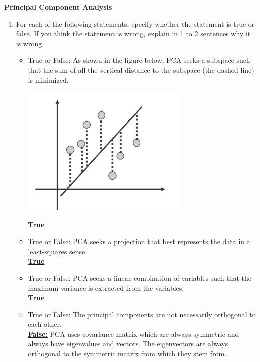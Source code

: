 \begin{Q}
\textbf{\Large Principal Component Analysis}\\

\begin{enumerate}

\item For each of the following statements, specify whether the statement is true or false. If you think the statement is wrong, explain in 1 to 2 sentences why it is wrong.


\begin{itemize}
\item True or False: As shown in the figure below, PCA seeks a subspace such that the sum of all the vertical distance to the subspace (the dashed line) is minimized.
\begin{center}
 \includegraphics[width=8cm]{figs/pca.pdf}
 \end{center}
\underline{\textbf{True}}


\item True or False: PCA seeks a projection that best represents the data in a least-squares sense.\\
\textbf{\underline{True}}

\item  True or False: PCA seeks a linear combination of variables such that the maximum variance is extracted from the variables.\\
\textbf{\underline{True}}

\item True or False: The principal components are not necessarily orthogonal to each other. \\
\textbf{\underline{False:}} PCA uses covariance matrix which are always symmetric and always have eigenvalues and vectors. The eigenvectors are always orthogonal to the symmetric matrix from which they stem from.

\end{itemize}



\end{enumerate}
\end{Q}
